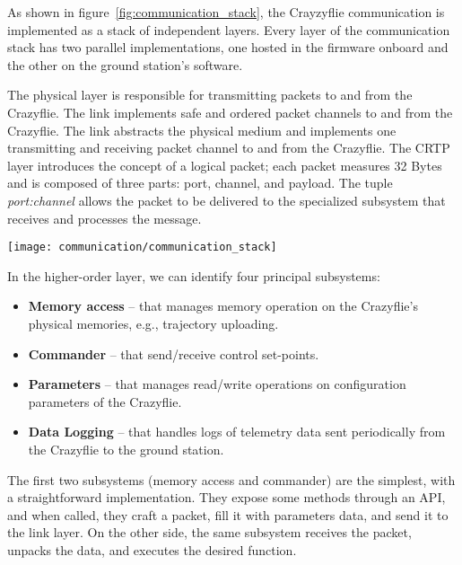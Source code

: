 As shown in figure~\ref{fig:communication_stack}, the Crayzyflie communication is implemented as a stack of independent layers.
Every layer of the communication stack has two parallel implementations, one hosted in the firmware onboard and the other on the ground station's software.

The physical layer is responsible for transmitting packets to and from the Crazyflie. The link implements safe and ordered packet channels to and from the Crazyflie. 
The link abstracts the physical medium and implements one transmitting and receiving packet channel to and from the Crazyflie.
The CRTP layer introduces the concept of a logical packet; each packet measures 32 Bytes and is composed of three parts: port, channel, and payload.
The tuple \textit{port:channel} allows the packet to be delivered to the specialized subsystem that receives and processes the message.

\begin{SCfigure}[\sidecaptionrelwidth][h]
    \texttt{[image: communication/communication\_stack]}
    \caption[The Crazyflie communication stack]{The Crayzyflie communication stack is composed of 4 independent layers: Subsystems, CRTP, Link, Physical medium}
    \label{fig:communication_stack}
\end{SCfigure}

In the higher-order layer, we can identify four principal subsystems:
\begin{itemize}
    \item \textbf{Memory access} -- that manages memory operation on the Crazyflie's physical memories, e.g., trajectory uploading.
    \item \textbf{Commander} -- that send/receive control set-points.
    \item \textbf{Parameters} -- that manages read/write operations on configuration parameters of the Crazyflie.
    \item \textbf{Data Logging} -- that handles logs of telemetry data sent periodically from the Crazyflie to the ground station. 
\end{itemize} 

The first two subsystems (memory access and commander) are the simplest, with a straightforward implementation. 
They expose some methods through an API, and when called, they craft a packet, fill it with parameters data, and send it to the link layer.
On the other side, the same subsystem receives the packet, unpacks the data, and executes the desired function.


